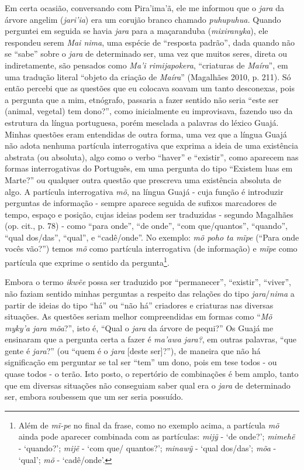 Em certa ocasião, conversando com Pira'ima'ã, ele me informou que o
\emph{jara} da árvore angelim (\emph{jari'ia}) era um corujão branco
chamado \emph{puhupuhua.} Quando perguntei em seguida se havia
\emph{jara} para a maçaranduba (\emph{mixiranyka}), ele respondeu serem
\emph{Mai nima}, uma espécie de ``resposta padrão'', dada quando não se
``sabe'' sobre o \emph{jara} de determinado ser, uma vez que muitos
seres, direta ou indiretamente, são pensados como \emph{Ma'i
rimijapokera}, ``criaturas de \emph{Maíra}'', em uma tradução literal
``objeto da criação de \emph{Maíra}'' (Magalhães 2010, p. 211). Só então
percebi que as questões que eu colocava soavam um tanto desconexas, pois
a pergunta que a mim, etnógrafo, passaria a fazer sentido não seria
``este ser (animal, vegetal) tem dono?'', como inicialmente eu
improvisava, fazendo uso da estrutura da língua portuguesa, porém
mesclada a palavras do léxico Guajá. Minhas questões eram entendidas de
outra forma, uma vez que a língua Guajá não adota nenhuma partícula
interrogativa que exprima a ideia de uma existência abstrata (ou
absoluta), algo como o verbo ``haver'' e ``existir'', como aparecem nas
formas interrogativas do Português, em uma pergunta do tipo ``Existem
luas em Marte?'' ou qualquer outra questão que prescreva uma existência
absoluta de algo. A partícula interrogativa \emph{mõ}, na língua Guajá -
cuja função é introduzir perguntas de informação - sempre aparece
seguida de sufixos marcadores de tempo, espaço e posição, cujas ideias
podem ser traduzidas - segundo Magalhães (op. cit., p. 78) - como ``para
onde'', ``de onde'', ``com que/quantos'', ``quando'', ``qual dos/das'', ``qual'', e
``cadê/onde''. No exemplo: \emph{mõ poho ta mĩpe} (``Para onde vocês vão?'')
temos \emph{mõ} como partícula interrogativa (de informação) e
\emph{mĩpe} como partícula que exprime o sentido da pergunta\footnote{Além
  de \emph{mĩ-pe} no final da frase, como no exemplo acima, a partícula
  \emph{mõ} ainda pode aparecer combinada com as partículas: \emph{mijỹ}
  - `de onde?'; \emph{mimehẽ} - `quando?'; \emph{mijẽ} - `com que/
  quantos?'; \emph{minawỹ} - `qual dos/das'; \emph{mõa} - `qual';
  \emph{mõ} - `cadê/onde'.}.

Embora o termo \emph{ikwẽe} possa ser traduzido por ``permanecer'',
``existir'', ``viver'', não faziam sentido minhas perguntas a respeito das
relações do tipo \emph{jara}/\emph{nima} a partir de ideias do tipo ``há''
ou ``não há'' criadores e criaturas nas diversas situações. As questões
seriam melhor compreendidas em formas como ``\emph{Mõ myky'a jara mõa}?'',
isto é, ``Qual o \emph{jara} da árvore de pequi?'' Os Guajá me ensinaram
que a pergunta certa a fazer é \emph{ma'awa jara?}, em outras palavras,
``que gente é \emph{jara}?'' (ou ``quem é o \emph{jara} {[}deste ser{]}?''),
de maneira que não há significação em perguntar se tal ser ``tem'' um
dono, pois em tese todos - ou quase todos - o terão. Isto posto, o
repertório de combinações é bem amplo, tanto que em diversas situações
não conseguiam saber qual era o \emph{jara} de determinado ser, embora
soubessem que um ser seria possuído.

